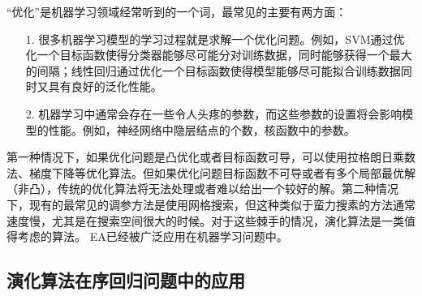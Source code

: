“优化”是机器学习领域经常听到的一个词，最常见的主要有两方面：
\begin{enumerate}
\item[1.]很多机器学习模型的学习过程就是求解一个优化问题。例如，SVM通过优化一个目标函数使得分类器能够尽可能分对训练数据，同时能够获得一个最大的间隔；线性回归通过优化一个目标函数使得模型能够尽可能拟合训练数据同时又具有良好的泛化性能。
\item[2.]机器学习中通常会存在一些令人头疼的参数，而这些参数的设置将会影响模型的性能。例如，神经网络中隐层结点的个数，核函数中的参数。
\end{enumerate}
第一种情况下，如果优化问题是凸优化或者目标函数可导，可以使用拉格朗日乘数法、梯度下降等优化算法。但如果优化问题目标函数不可导或者有多个局部最优解（非凸），传统的优化算法将无法处理或者难以给出一个较好的解。第二种情况下，现有的最常见的调参方法是使用网格搜索，但这种类似于蛮力搜素的方法通常速度慢，尤其是在搜索空间很大的时候。对于这些棘手的情况，演化算法是一类值得考虑的算法。
EA已经被广泛应用在机器学习问题中\citep{liu2000evolutionary}\citep{tang2005linear}\citep{liu2000ensemble}。


\subsection{演化算法在序回归问题中的应用}

